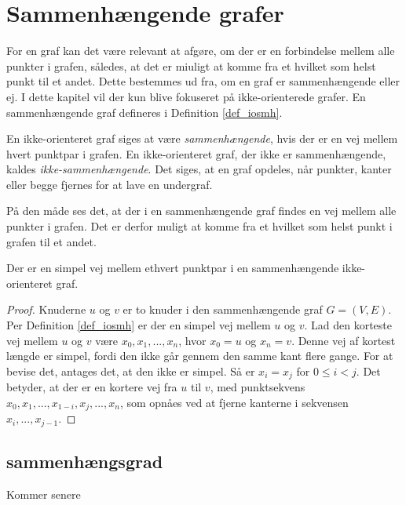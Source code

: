 \section{Sammenhængende grafer}
For en graf kan det være relevant at afgøre, om der er en forbindelse mellem alle punkter i grafen, således, at det er miuligt at komme fra et hvilket som helst punkt til et andet. Dette bestemmes ud fra, om en graf er sammenhængende eller ej.
I dette kapitel vil der kun blive fokuseret på ikke-orienterede grafer.
En sammenhængende graf defineres i Definition \ref{def_iosmh}.

\begin{defn}
\label{def_iosmh}
En ikke-orienteret graf siges at være \textit{sammenhængende}, hvis der er en vej mellem hvert punktpar i grafen. 
En ikke-orienteret graf, der ikke er sammenhængende, kaldes \textit{ikke-sammenhængende}.
Det siges, at en graf opdeles, når punkter, kanter eller begge fjernes for at lave en undergraf. 
\end{defn}

\noindent På den måde ses det, at der i en sammenhængende graf findes en vej mellem alle punkter i grafen. 
Det er derfor muligt at komme fra et hvilket som helst punkt i grafen til et andet.

\begin{thm}
Der er en simpel vej mellem ethvert punktpar i en sammenhængende ikke-orienteret graf.
\end{thm}

\begin{proof}
Knuderne $u$ og $v$ er to knuder i den sammenhængende graf $G=(V,E)$.
Per Definition \ref{def_iosmh} er der en simpel vej mellem $u$ og $v$.
Lad den korteste vej mellem $u$ og $v$ være $x_0,x_1,...,x_n$, hvor $x_0=u$ og $x_n=v$.
Denne vej af kortest længde er simpel, fordi den ikke går gennem den samme kant flere gange. 
For at bevise det, antages det, at den ikke er simpel. 
Så er $x_i=x_j$ for $0 \leq i < j$.
Det betyder, at der er en kortere vej fra $u$ til $v$, med punktsekvens $x_0,x_1,...,x_{1-i},x_j,...,x_n$, som opnåes ved at fjerne kanterne i sekvensen $x_i,...,x_{j-1}$.
\end{proof}

\subsection{sammenhængsgrad}
Kommer senere

